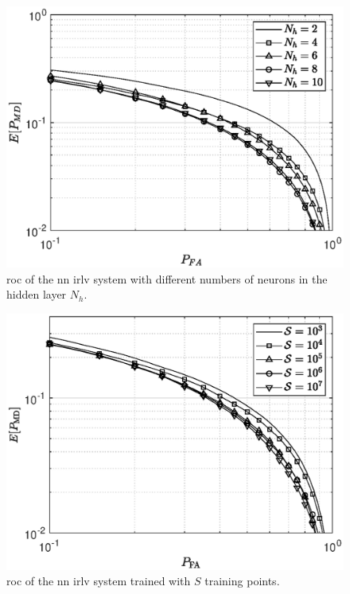 \documentclass[conference,final]{IEEEtran}
\begin{document}
\begin{figure}[t]
    \centering
    \includegraphics[width=1\columnwidth]{res_avg_nNeur_1e5.eps}
    \caption{\ac{roc} of the \ac{nn} \ac{irlv} system with different numbers of neurons in the hidden layer $N_h$.}
    \label{fig:n_neur}
\end{figure}

\begin{figure}[t]
    \centering
    \includegraphics[width=1\columnwidth]{res_avg_nTrain.eps}
    \caption{\ac{roc} of the \ac{nn} \ac{irlv} system trained with $S$ training points.}
    \label{fig:n_train}
\end{figure}
\end{document}
